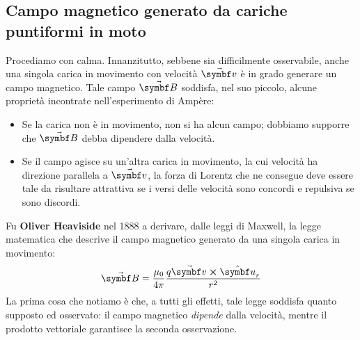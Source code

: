 \subsection{Campo magnetico generato da cariche puntiformi in moto}
Procediamo con calma. Innanzitutto, sebbene sia difficilmente osservabile, anche una singola carica in movimento con velocità $\vba{v}$ è in grado generare un campo magnetico. Tale campo $\vba{B}$ soddisfa, nel suo piccolo, alcune proprietà incontrate nell'esperimento di Ampère:
\begin{itemize}
	\item Se la carica non è in movimento, non si ha alcun campo; dobbiamo supporre che $\vba{B}$ debba dipendere dalla velocità.
	\item Se il campo agisce su un'altra carica in movimento, la cui velocità ha direzione parallela a $\vba{v}$, la forza di Lorentz che ne consegue deve essere tale da risultare attrattiva se i versi delle velocità sono concordi e repulsiva se sono discordi. 
\end{itemize}
Fu \textbf{Oliver Heaviside} nel 1888 a derivare, dalle leggi di Maxwell, la legge matematica che descrive il campo magnetico generato da una singola carica in movimento:
\begin{equation}
	\vba{B}=\frac{\mu_0}{4\pi}\frac{q\vba{v}\cross\vbh{u}_r}{r^2}
\end{equation}
La prima cosa che notiamo è che, a tutti gli effetti, tale legge soddisfa quanto supposto ed osservato: il campo magnetico \textit{dipende} dalla velocità, mentre il prodotto vettoriale garantisce la seconda osservazione.


